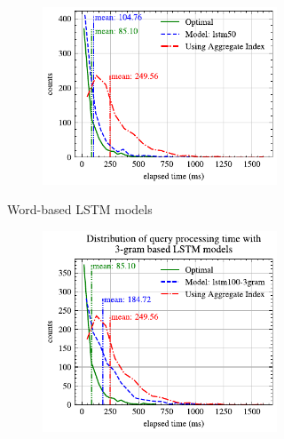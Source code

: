 \begin{figure}[!th]
\begin{subfigure}{0.45\textwidth}
\begin{subfigure}{\textwidth}
			\includegraphics[]{my/graphics/perf_dist_lstm50_A.pdf}
		\end{subfigure}
		\caption{Word-based LSTM models}
	\end{subfigure}
	\hfill
	\begin{subfigure}{0.45\textwidth}
		\begin{subfigure}{\textwidth}
			\centering
			\includegraphics[]{my/graphics/perf_dist_lstm100_3gram_A.pdf}
		\end{subfigure}
		\vfill
		\begin{subfigure}{\textwidth}
			\centering

\end{subfigure}
\end{subfigure}
\end{figure}
